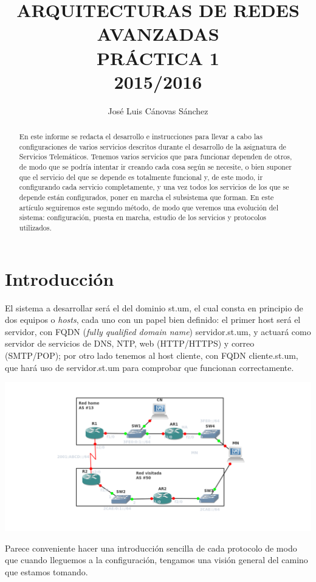 \documentclass{article}
\author{José Luis Cánovas Sánchez}
\title{ARQUITECTURAS DE REDES AVANZADAS\\PRÁCTICA 1\\ 2015/2016}
\date{}
\begin{document}
\maketitle

\begin{abstract}
	En este informe se redacta el desarrollo e instrucciones para llevar a cabo las configuraciones de varios servicios descritos durante el desarrollo de la asignatura de Servicios Telemáticos. Tenemos varios servicios que para funcionar dependen de otros, de modo que se podría intentar ir creando cada cosa según se necesite, o bien suponer que el servicio del que se depende es totalmente funcional y, de este modo, ir configurando cada servicio completamente, y una vez todos los servicios de los que se depende están configurados, poner en marcha el subsistema que forman. En este artículo seguiremos este segundo método, de modo que veremos una evolución del sistema: configuración, puesta en marcha, estudio de los servicios y protocolos utilizados.
\end{abstract}

\tableofcontents
\section{Introducción}
El sistema a desarrollar será el del dominio st.um, el cual consta en principio de dos equipos o \textit{hosts}, cada uno con un papel bien definido: el primer host será el servidor, con FQDN (\textit{fully qualified domain name})  servidor.st.um, y actuará como servidor de servicios de DNS, NTP, web (HTTP/HTTPS) y correo (SMTP/POP); por otro lado tenemos al host cliente, con FQDN cliente.st.um, que hará uso de servidor.st.um para comprobar que funcionan correctamente.\par

\begin{center} 
	\includegraphics[scale=0.5]{images/topologyInic.png}
\end{center}

Parece conveniente hacer una introducción sencilla de cada protocolo de modo que cuando lleguemos a la configuración, tengamos una visión general del camino que estamos tomando.\par
\end{document}
